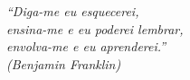 \begin{epigrafe}
    \vspace*{\fill}
	\begin{flushright}
    \textit{
    ``Diga-me eu esquecerei,\\
        ensina-me e eu poderei lembrar,\\
        envolva-me e eu aprenderei.''\\
        (Benjamin Franklin)}
	\end{flushright}
\end{epigrafe}
